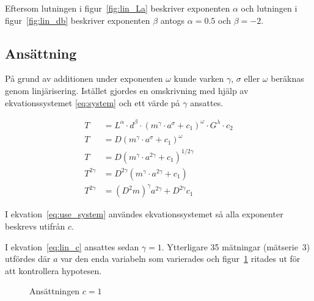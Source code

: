 \documentclass[a4paper,12pt]{article}
\begin{document}
Eftersom lutningen i figur~\ref{fig:lin_La} beskriver exponenten $\alpha$ och
lutningen i figur~\ref{fig:lin_db} beskriver exponenten $\beta$ antogs $\alpha =
0.5$ och $\beta = -2$.

\subsection{Ansättning}

På grund av additionen under exponenten $\omega$ kunde varken $\gamma$, $\sigma$ eller $\omega$
beräknas genom linjärisering. Istället gjordes en omskrivning med hjälp av
ekvationssystemet \eqref{eq:system} och ett värde på $\gamma$ ansattes.

\begin{align}
  T &= L^\alpha \cdot d^\beta \cdot (m^\gamma \cdot a^\sigma + c_1)^\omega \cdot G^\lambda  \cdot c_2\nonumber \\
  T &= D (m^\gamma \cdot a^\sigma + c_1)^\omega \nonumber \\
  T &= D (m^\gamma \cdot a^{2\gamma} + c_1)^{1/2\gamma} \label{eq:use_system} \\
  T^{2\gamma} &= D^{2\gamma} (m^\gamma \cdot a^{2\gamma} + c_1) \nonumber \\
  T^{2\gamma} &= (D^2m)^\gamma a^{2\gamma} + D^{2\gamma}c_1 \label{eq:lin_c}
\end{align}

I ekvation~\eqref{eq:use_system} användes ekvationssystemet så alla exponenter
beskrevs utifrån $c$.

I ekvation~\eqref{eq:lin_c} ansattes sedan $\gamma = 1$. Ytterligare 35 mätningar (mätserie~3)
utfördes där $a$ var den enda variabeln som varierades och figur~\ref{fig:lin_c}
ritades ut för att kontrollera hypotesen.

\begin{figure}[h!]
  \caption{Ansättningen $c = 1$}
  \label{fig:lin_c}
\end{figure}
\end{document}

